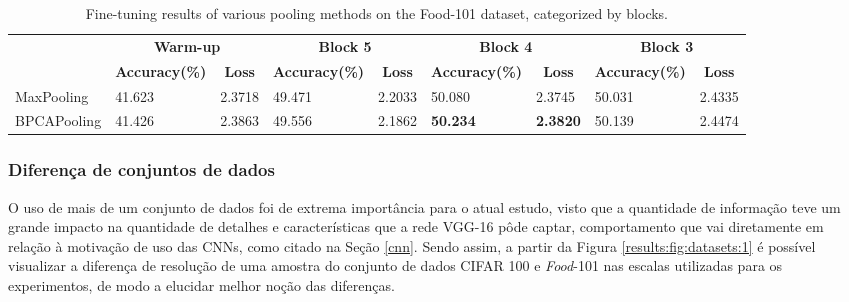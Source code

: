 \begin{table}[htbp]
    \caption{Fine-tuning results of various pooling methods on the Food-101 dataset, categorized by blocks.}
    \label{tab:food_finetuning}
    \centering
    \begin{tabular}{lllllllll}
    \firsthline
    \multicolumn{1}{c}{\textbf{Pooling Methods}} & \multicolumn{2}{c}{\textbf{Warm-up}}                                          & \multicolumn{2}{c}{\textbf{Block 5}}                                          & \multicolumn{2}{c}{\textbf{Block 4}}                                          & \multicolumn{2}{c}{\textbf{Block 3}}                                          \\
    \cline{2-9}
    \multicolumn{1}{c}{\textbf{}}                & \multicolumn{1}{c}{\textbf{Accuracy(\%)}} & \multicolumn{1}{c}{\textbf{Loss}} & \multicolumn{1}{c}{\textbf{Accuracy(\%)}} & \multicolumn{1}{c}{\textbf{Loss}} & \multicolumn{1}{c}{\textbf{Accuracy(\%)}} & \multicolumn{1}{c}{\textbf{Loss}} & \multicolumn{1}{c}{\textbf{Accuracy(\%)}} & \multicolumn{1}{c}{\textbf{Loss}} \\
    \hline
    MaxPooling                                  &                                    41.623 &                            2.3718 &                                    49.471 &                            2.2033 &                                    50.080 &                            2.3745 &                                    50.031 &                            2.4335 \\
    BPCAPooling                                   &                                    41.426 &                            2.3863 &                                    49.556 &                            2.1862 &                                    \textbf{50.234} &                            \textbf{2.3820} &                                    50.139 &                            2.4474 
    \end{tabular}
\end{table}

\subsubsection{Diferença de conjuntos de dados}
\label{results:class:datasets}
O uso de mais de um conjunto de dados foi de extrema importância para o atual estudo, visto que a quantidade de informação teve um grande impacto na quantidade de detalhes e características que a rede VGG-16 pôde captar, comportamento que vai diretamente em relação à motivação de uso das CNNs, como citado na Seção \ref{cnn}. Sendo assim, a partir da Figura \ref{results:fig:datasets:1} é possível visualizar a diferença de resolução de uma amostra do conjunto de dados CIFAR 100 e \textit{Food}-101 nas escalas utilizadas para os experimentos, de modo a elucidar melhor noção das diferenças.

